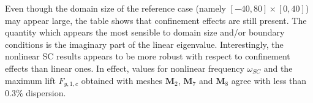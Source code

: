 \documentclass[twocolumn,10pt]{asme2ej}
\begin{document}
Even though the domain size of the reference case (namely $[-40,80]\times[0,40]$) may appear large, the table shows that confinement effects are still present. The quantity which appears the most sensible to domain size and/or boundary conditions is the imaginary part of the linear eigenvalue. Interestingly, the nonlinear SC results appears to be more robust with respect to confinement effects than linear ones. 
In effect, values for nonlinear frequency $\omega_{SC}$ and the maximum lift $F_{y,1,c}$ obtained with meshes  $\mathbf{M}_2$, $\mathbf{M}_7$
and  $\mathbf{M}_8$ agree with less than $0.3\%$ dispersion.















\end{document}
